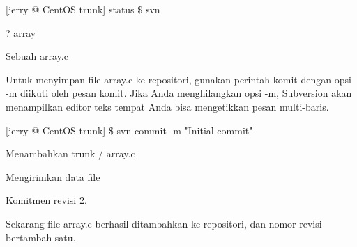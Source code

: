  \hspace*{0.5in} [jerry @ CentOS trunk] status  $  \$  $ svn \par
\noindent 
 \hspace*{0.5in} ? array \par
\noindent 
Sebuah array.c \par
\noindent 
Untuk menyimpan file array.c ke repositori, gunakan perintah komit dengan opsi -m diikuti oleh pesan komit. Jika Anda menghilangkan opsi -m, Subversion akan menampilkan editor teks tempat Anda bisa mengetikkan pesan multi-baris. \par
\noindent 
 \hspace*{0.5in} \vspace{12pt}
\noindent 
 \hspace*{0.5in} [jerry @ CentOS trunk]  $  \$  $ svn commit -m "Initial commit" \par
\noindent 
 \hspace*{0.5in} Menambahkan trunk / array.c \par
\noindent 
 \hspace*{0.5in} Mengirimkan data file \par
\noindent 
 \hspace*{0.5in} Komitmen revisi 2. \par
\noindent 
 \hspace*{0.5in} Sekarang file array.c berhasil ditambahkan ke repositori, dan nomor revisi bertambah satu. \par


